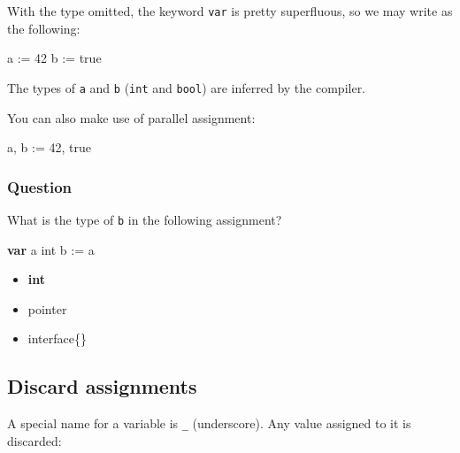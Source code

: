 \documentclass[]{book}
\newenvironment{Shaded}{\begin{snugshade}}{\end{snugshade}}
\newcommand{\DataTypeTok}[1]{\textcolor[rgb]{0.13,0.29,0.53}{#1}}
\newcommand{\DecValTok}[1]{\textcolor[rgb]{0.00,0.00,0.81}{#1}}
\newcommand{\KeywordTok}[1]{\textcolor[rgb]{0.13,0.29,0.53}{\textbf{#1}}}
\newcommand{\NormalTok}[1]{#1}
\newcommand{\OtherTok}[1]{\textcolor[rgb]{0.56,0.35,0.01}{#1}}
\providecommand{\tightlist}{%
  \setlength{\itemsep}{0pt}\setlength{\parskip}{0pt}}
\let\BeginKnitrBlock\begin \let\EndKnitrBlock\end
\begin{document}
With the type omitted, the keyword \texttt{var} is pretty superfluous, so we may write
as the following:

\begin{Shaded}
\begin{Highlighting}[]
\NormalTok{a := }\DecValTok{42}
\NormalTok{b := }\OtherTok{true}
\end{Highlighting}
\end{Shaded}

\BeginKnitrBlock{rmdnote}
The types of \texttt{a} and \texttt{b} (\texttt{int} and \texttt{bool}) are inferred by the compiler.
\EndKnitrBlock{rmdnote}

You can also make use of parallel assignment:

\begin{Shaded}
\begin{Highlighting}[]
\NormalTok{a, b := }\DecValTok{42}\NormalTok{, }\OtherTok{true}
\end{Highlighting}
\end{Shaded}

\hypertarget{question-10}{%
\subsubsection*{Question}\label{question-10}}

What is the type of \texttt{b} in the following assignment?

\begin{Shaded}
\begin{Highlighting}[]
\KeywordTok{var}\NormalTok{ a }\DataTypeTok{int}
\NormalTok{b := a}
\end{Highlighting}
\end{Shaded}

\begin{itemize}
\tightlist
\item
  \textbf{int}
\item
  pointer
\item
  interface\{\}
\end{itemize}

\hypertarget{discard-assignments}{%
\subsection{Discard assignments}\label{discard-assignments}}

A special name for a variable is \texttt{\_} (underscore). Any value assigned to it is
discarded:
\end{document}

